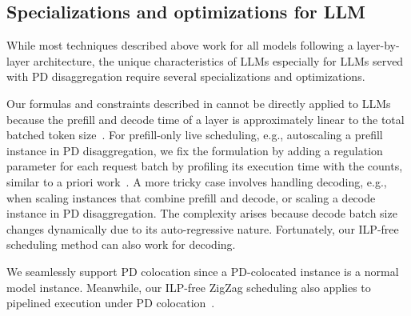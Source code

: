 \subsection{Specializations and optimizations for LLM}
\label{sec:design-llm}

\noindent
While most techniques described above work for all models following a
layer-by-layer architecture,
the unique characteristics of LLMs especially for LLMs served with PD disaggregation
require several specializations and optimizations.

Our formulas and constraints described in \textsection{\ref{sec:design-pp}} cannot be directly applied
to LLMs
because the prefill and decode time of a layer is approximately
linear to the total batched token size~\cite{DBLP:conf/isca/PatelCZSGMB24,DBLP:journals/corr/abs-2404-09526}.
For prefill-only live scheduling, e.g., autoscaling a prefill instance in PD disaggregation,
we fix the formulation by adding
a regulation parameter for each request batch by profiling its execution time with the counts,
similar to a priori work~\cite{DBLP:journals/corr/abs-2404-09526}.
A more tricky case involves handling decoding,
e.g., when scaling instances that combine prefill and decode,
or scaling a decode instance in PD disaggregation.
The complexity arises because decode batch size changes dynamically
due to its auto-regressive nature.
Fortunately, our ILP-free scheduling method can also work for decoding.

We seamlessly support PD colocation since a PD-colocated instance 
is a normal model instance. 
Meanwhile, our ILP-free ZigZag scheduling also applies to pipelined execution under PD colocation~\cite{298679}.

